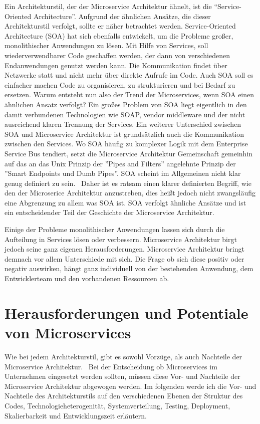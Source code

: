 Ein Architekturstil, der der Microservice Architektur ähnelt, ist die ``Service-Oriented Architecture''. Aufgrund der ähnlichen Ansätze, die dieser Architekturstil verfolgt, sollte er näher betrachtet werden.
Service-Oriented Architecture (SOA) hat sich ebenfalls entwickelt, um die Probleme großer, monolithischer Anwendungen zu lösen.\cite[][Seite 8]{newman2015building} Mit Hilfe von Services, soll wiederverwendbarer Code geschaffen werden, der dann von verschiedenen Endanwendungen genutzt werden kann. Die Kommunikation findet über Netzwerke statt und nicht mehr über direkte Aufrufe im Code. Auch SOA soll es einfacher machen Code zu organisieren, zu strukturieren und bei Bedarf zu ersetzen. Warum entsteht nun also der Trend der Microservices, wenn SOA einen ähnlichen Ansatz verfolgt? Ein großes Problem von SOA liegt eigentlich in den damit verbundenen Technologien wie SOAP, vendor middleware und der nicht ausreichend klaren Trennung der Services.\cite[][Seite 8]{newman2015building} 
Ein weiterer Unterschied zwischen SOA und Microservice Architektur ist grundsätzlich auch die Kommunikation zwischen den Services. Wo SOA häufig zu komplexer Logik mit dem Enterprise Service Bus\cite[][]{esb} tendiert, setzt die Microservice Architektur Gemeinschaft gemeinhin auf das an das Unix Prinzip der ''Pipes and Filters''\cite[vgl.][]{microsoft:pipes} angelehnte Prinzip der ''Smart Endpoints und Dumb Pipes''.\cite[vgl.][]{Fowler:Intro}
SOA scheint im Allgemeinen nicht klar genug definiert zu sein.~\cite[vgl.][]{Fowler:Intro} Daher ist es ratsam einen klarer definierten Begriff, wie den der Microserice Architektur anzustreben,\cite[][]{Fowler:Intro} dies heißt jedoch nicht zwangsläufig eine Abgrenzung zu allem was SOA ist. SOA verfolgt ähnliche Ansätze und ist ein entscheidender Teil der Geschichte der Microservice Architektur.

Einige der Probleme monolithischer Anwendungen lassen sich durch die Aufteilung in Services lösen oder verbessern. Microservice Architektur birgt jedoch seine ganz eigenen Herausforderungen. Microservice Architektur bringt demnach vor allem Unterschiede mit sich. Die Frage ob sich diese positiv oder negativ auswirken, hängt ganz individuell von der bestehenden Anwendung, dem Entwicklerteam und den vorhandenen Ressourcen ab.

\section{Herausforderungen und Potentiale von Microservices}
Wie bei jedem Architekturstil, gibt es sowohl Vorzüge, als auch Nachteile der Microservice Architektur.~\cite[vgl.][]{Fowler:Guide}
Bei der Entscheidung ob Microservices im Unternehmen eingesetzt werden sollten, müssen diese Vor- und Nachteile der Microservice Architektur abgewogen werden.
Im folgenden werde ich die Vor- und Nachteile des Architekturstils auf den verschiedenen Ebenen der Struktur des Codes, Technologieheterogenität, Systemverteilung, Testing, Deployment, Skalierbarkeit und Entwicklungszeit erläutern.

